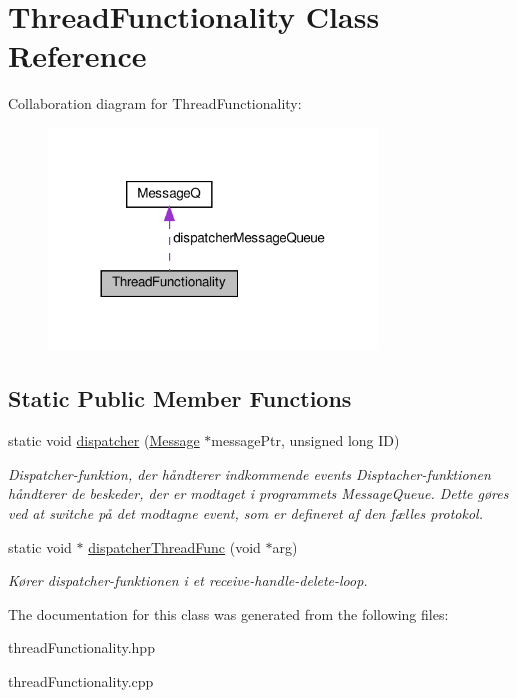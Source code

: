 \hypertarget{classThreadFunctionality}{}\section{Thread\+Functionality Class Reference}
\label{classThreadFunctionality}


Collaboration diagram for Thread\+Functionality\+:\nopagebreak
\begin{figure}[H]
\begin{center}
\leavevmode
\includegraphics[width=248pt]{classThreadFunctionality__coll__graph}
\end{center}
\end{figure}
\subsection*{Static Public Member Functions}
\begin{DoxyCompactItemize}
\item 
\mbox{\label{classThreadFunctionality_aa74339ed85a8193e09faf43b7fd648c8}} 
static void \hyperlink{classThreadFunctionality_aa74339ed85a8193e09faf43b7fd648c8}{dispatcher} (\hyperlink{classMessage}{Message} $\ast$message\+Ptr, unsigned long ID)
\begin{DoxyCompactList}\small\item\em Dispatcher-\/funktion, der håndterer indkommende events Disptacher-\/funktionen håndterer de beskeder, der er modtaget i programmets Message\+Queue. Dette gøres ved at switche på det modtagne event, som er defineret af den fælles protokol. \end{DoxyCompactList}\item 
\mbox{\label{classThreadFunctionality_ac3e321db9529381c58a16abe25b8577e}} 
static void $\ast$ \hyperlink{classThreadFunctionality_ac3e321db9529381c58a16abe25b8577e}{dispatcher\+Thread\+Func} (void $\ast$arg)
\begin{DoxyCompactList}\small\item\em Kører dispatcher-\/funktionen i et \textquotesingle{}receive-\/handle-\/delete\textquotesingle{}-\/loop. \end{DoxyCompactList}\end{DoxyCompactItemize}


The documentation for this class was generated from the following files\+:\begin{DoxyCompactItemize}
\item 
thread\+Functionality.\+hpp\item 
thread\+Functionality.\+cpp\end{DoxyCompactItemize}
